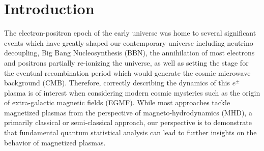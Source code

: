 \documentclass[Universe,article,submit,moreauthors,pdftex]{Definitions/mdpi}
\begin{document}
\section{Introduction}
\noindent The electron-positron epoch of the early universe was home to several significant events which have greatly shaped our contemporary universe including neutrino decoupling, Big Bang Nucleosynthesis (BBN), the annihilation of most electrons and positrons partially re-ionizing the universe, as well as setting the stage for the eventual recombination period which would generate the cosmic microwave background (CMB). Therefore, correctly describing the dynamics of this $e^{\pm}$ plasma is of interest when considering modern cosmic mysteries such as the origin of extra-galactic magnetic fields (EGMF). While most approaches tackle magnetized plasmas from the perspective of magneto-hydrodynamics (MHD), a primarily classical or semi-classical approach, our perspective is to demonstrate that fundamental quantum statistical analysis can lead to further insights on the behavior of magnetized plasmas.
\end{document}
